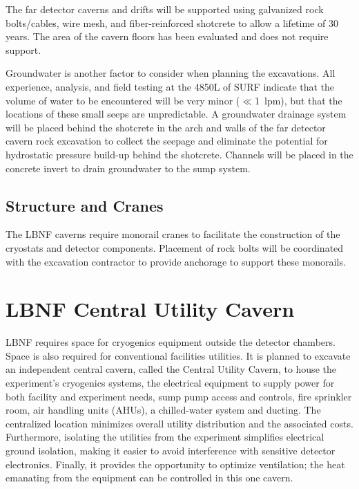 The far detector %
caverns and drifts will be supported using galvanized rock bolts/cables, wire mesh, and fiber-reinforced shotcrete to allow a lifetime of 30 years. The area of the cavern floors  
has been evaluated and does not require support. 

Groundwater is another factor to consider when planning the excavations. All experience, analysis, and field testing at the 4850L of SURF indicate that the volume of water to be encountered will be very minor ($\ll$1~lpm),  but that the locations of these small seeps are unpredictable. %
A groundwater drainage system will be placed behind the shotcrete in the arch and walls of the far detector cavern rock excavation to collect %
the seepage and eliminate the potential for hydrostatic pressure build-up behind the shotcrete. Channels will be placed in the concrete invert to drain groundwater to the sump system. 


\subsection{Structure and Cranes}
\label{sec:fscf-excav-cranes}

The LBNF caverns require monorail cranes to facilitate the construction of the cryostats and detector components. Placement of rock bolts will be coordinated with the excavation contractor to provide anchorage to support these monorails.

\section{LBNF Central Utility Cavern}
\label{sec:fscf-excav-util-cav}

LBNF requires space for cryogenics equipment outside the detector chambers. Space is also required for conventional facilities utilities. It is planned to excavate an independent central cavern, called  the Central Utility Cavern, to house the experiment's cryogenics systems, the electrical equipment to supply power for both facility and experiment needs, sump pump access and controls, fire sprinkler room, air handling units (AHUs), a chilled-water system and ducting. The centralized location minimizes overall utility distribution and the associated costs. Furthermore, isolating the utilities from the experiment simplifies electrical ground isolation, making it easier to avoid interference with sensitive detector electronics. Finally, it provides the opportunity to optimize ventilation; the heat emanating from the equipment can be controlled in this one cavern. 

